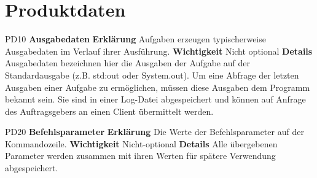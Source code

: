 \documentclass[a4paper,12pt]{article}
\begin{document}
\section{Produktdaten}
\begin{itemize}[nosep]
\leftskip=0.5cm

\begin{comment}

\begin{minipage}[t]{\linewidth}
\item[PD00] \textbf{}
\subitem \textbf{Erklärung} 
\subitem \textbf{Wichtigkeit} 
\subitem \textbf{Details} 
\end{minipage}
\pagebreak

\end{comment}

\begin{minipage}[t]{\linewidth}
\item[PD10] \textbf{Ausgabedaten}
\subitem \textbf{Erklärung} Aufgaben erzeugen typischerweise Ausgabedaten im Verlauf ihrer Ausführung.
\subitem \textbf{Wichtigkeit} Nicht optional
\subitem \textbf{Details} Ausgabedaten bezeichnen hier die Ausgaben der Aufgabe auf der Standardausgabe (z.B. std:out oder System.out).\newline
Um eine Abfrage der letzten Ausgaben einer Aufgabe zu ermöglichen, müssen diese Ausgaben dem Programm bekannt sein. Sie sind in einer Log-Datei abgespeichert und können auf Anfrage des Auftragsgebers an einen Client übermittelt werden.
\end{minipage}
\pagebreak

\begin{minipage}[t]{\linewidth}
\item[PD20] \textbf{Befehlsparameter}
\subitem \textbf{Erklärung} Die Werte der Befehlsparameter auf der Kommandozeile.
\subitem \textbf{Wichtigkeit} Nicht-optional
\subitem \textbf{Details} Alle übergebenen Parameter werden zusammen mit ihren Werten für spätere Verwendung abgespeichert.
\end{minipage}
\pagebreak


\end{itemize}
\end{document}
